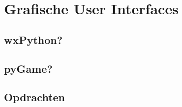 \chapter{Grafische User Interfaces}
\lipsum[1-3] %

\section{wxPython?}
\lipsum[1-3] %

\section{pyGame?}
\lipsum[1-3] %

\section{Opdrachten}
\begin{exercise}

\end{exercise}

\begin{exercise}

\end{exercise}

\begin{exercise}

\end{exercise}

\begin{exercise}

\end{exercise}

\begin{exercise}

\end{exercise}

\begin{exercise}

\end{exercise}

\begin{exercise}

\end{exercise}

\begin{exercise}

\end{exercise}

